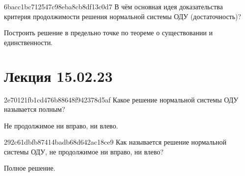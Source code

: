 \begin{note}{6bacc1bc712547c98eba8cb8df13c0d7}
    В чём основная идея доказательства критерия продолжимости решения нормальной системы ОДУ (достаточность)?

    \begin{cloze}{1}
        Построить решение в предельно точке по теореме о существовании и единственности.
    \end{cloze}
\end{note}

\section{Лекция 15.02.23}
\begin{note}{2e70121fb1cd476b88648f942378d5af}
    Какое решение нормальной системы ОДУ называется полным?

    \begin{cloze}{1}
        Не продолжимое ни вправо, ни влево.
    \end{cloze}
\end{note}

\begin{note}{292c61dbfb87414badb68d642ac18ce9}
    Как называется решение нормальной системы ОДУ, не продолжимое ни вправо, ни влево?

    \begin{cloze}{1}
        Полное решение.
    \end{cloze}
\end{note}


